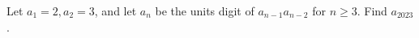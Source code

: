 Let $a_1=2,a_2=3$, and let $a_n$ be the units digit of $a_{n-1}a_{n-2}$ for $n\ge3$. Find $a_{2023}$.
